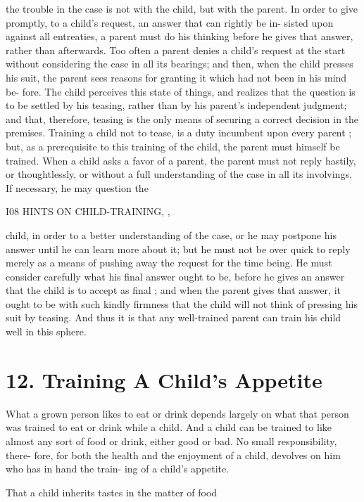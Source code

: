 \documentclass[
]{book}
\begin{document}
the trouble in the case is not with the child, but with the parent. In order to give promptly, to a child's request, an answer that can rightly be in- sisted upon against all entreaties, a parent must do his thinking before he gives that answer, rather than afterwards. Too often a parent denies a child's request at the start without considering the case in all its bearings; and then, when the child presses his suit, the parent sees reasons for granting it which had not been in his mind be- fore. The child perceives this state of things, and realizes that the question is to be settled by his teasing, rather than by his parent's independent judgment; and that, therefore, teasing is the only means of securing a correct decision in the premises. Training a child not to tease, is a duty incumbent upon every parent ; but, as a prerequisite to this training of the child, the parent must himself be trained. When a child asks a favor of a parent, the parent must not reply hastily, or thoughtlessly, or without a full understanding of the case in all its involvings. If necessary, he may question the

I08 HINTS ON CHILD-TRAINING, ,

child, in order to a better understanding of the case, or he may postpone his answer until he can learn more about it; but he must not be over quick to reply merely as a means of pushing away the request for the time being. He must consider carefully what his final answer ought to be, before he gives an answer that the child is to accept as final ; and when the parent gives that answer, it ought to be with such kindly firmness that the child will not think of pressing his suit by teasing. And thus it is that any well-trained parent can train his child well in this sphere.

\hypertarget{training-a-childs-appetite}{%
\chapter{12. Training A Child's Appetite}\label{training-a-childs-appetite}}

What a grown person likes to eat or drink depends largely on what that person was trained to eat or drink while a child. And a child can be trained to like almost any sort of food or drink, either good or bad. No small responsibility, there- fore, for both the health and the enjoyment of a child, devolves on him who has in hand the train- ing of a child's appetite.

That a child inherits tastes in the matter of food
\end{document}

